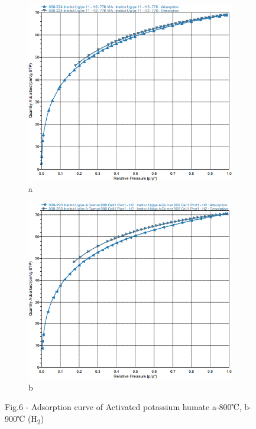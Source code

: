 \begin{figure}[H]
    \centering
    \begin{subfigure}[t]{0.45\textwidth}
        \centering
        \includegraphics[width=\textwidth]{media/chem2/image107}
        \caption*{a}
    \end{subfigure}
    \begin{subfigure}[t]{0.45\textwidth}
        \centering
        \includegraphics[width=\textwidth]{media/chem2/image108}
        \caption*{b}
    \end{subfigure}
    \caption*{Fig.6 - Adsorption curve of Activated potassium humate a-800℃, b-900℃ (H\textsubscript{2})}
\end{figure}
